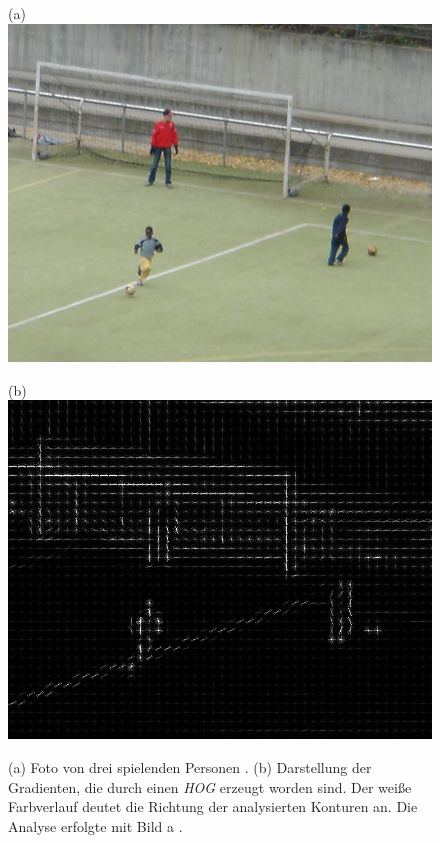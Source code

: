 
\begin{figure}[H]
	\centering
	\begin{minipage}[b]{0.47\textwidth}
		(a)
		\includegraphics[width=\textwidth]{Bilder/hog1crop.png}
	\end{minipage}
	\hfill
	\begin{minipage}[b]{0.47\textwidth}
		(b)
		\includegraphics[width=\textwidth]{Bilder/hog2crop.jpg}
	\end{minipage}
	\caption{(a) Foto von drei spielenden Personen \cite{inria1}. (b) Darstellung der Gradienten, die durch einen \textit{HOG} erzeugt worden sind. Der weiße Farbverlauf deutet die Richtung der analysierten Konturen an. Die Analyse erfolgte mit Bild a \cite{inria1}.}
	\label{fiq: hog}
\end{figure}
